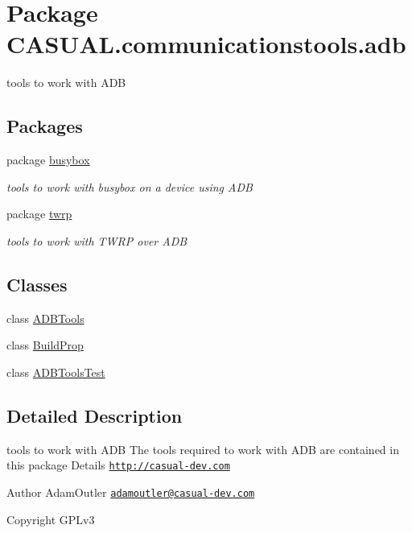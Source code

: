 \hypertarget{namespace_c_a_s_u_a_l_1_1communicationstools_1_1adb}{\section{Package C\-A\-S\-U\-A\-L.\-communicationstools.\-adb}
\label{namespace_c_a_s_u_a_l_1_1communicationstools_1_1adb}
}


tools to work with A\-D\-B  


\subsection*{Packages}
\begin{DoxyCompactItemize}
\item 
package \hyperlink{namespace_c_a_s_u_a_l_1_1communicationstools_1_1adb_1_1busybox}{busybox}
\begin{DoxyCompactList}\small\item\em tools to work with busybox on a device using A\-D\-B \end{DoxyCompactList}\item 
package \hyperlink{namespace_c_a_s_u_a_l_1_1communicationstools_1_1adb_1_1twrp}{twrp}
\begin{DoxyCompactList}\small\item\em tools to work with T\-W\-R\-P over A\-D\-B \end{DoxyCompactList}\end{DoxyCompactItemize}
\subsection*{Classes}
\begin{DoxyCompactItemize}
\item 
class \hyperlink{class_c_a_s_u_a_l_1_1communicationstools_1_1adb_1_1_a_d_b_tools}{A\-D\-B\-Tools}
\item 
class \hyperlink{class_c_a_s_u_a_l_1_1communicationstools_1_1adb_1_1_build_prop}{Build\-Prop}
\item 
class \hyperlink{class_c_a_s_u_a_l_1_1communicationstools_1_1adb_1_1_a_d_b_tools_test}{A\-D\-B\-Tools\-Test}
\end{DoxyCompactItemize}


\subsection{Detailed Description}
tools to work with A\-D\-B The tools required to work with A\-D\-B are contained in this package Details \href{http://casual-dev.com}{\tt http\-://casual-\/dev.\-com} \begin{DoxyAuthor}{Author}
Adam\-Outler \href{mailto:adamoutler@casual-dev.com}{\tt adamoutler@casual-\/dev.\-com} 
\end{DoxyAuthor}
\begin{DoxyCopyright}{Copyright}
G\-P\-Lv3 
\end{DoxyCopyright}
